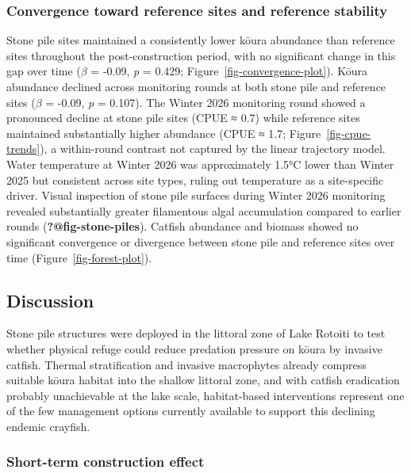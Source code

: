 \documentclass[
  letterpaper,
  DIV=11,
  numbers=noendperiod]{scrartcl}
\begin{document}
\subsubsection{Convergence toward reference sites and reference
stability}\label{convergence-toward-reference-sites-and-reference-stability}

Stone pile sites maintained a consistently lower kōura abundance than
reference sites throughout the post-construction period, with no
significant change in this gap over time (\(\beta\) = -0.09, \emph{p} =
0.429; {Figure~\ref{fig-convergence-plot}}). Kōura abundance declined
across monitoring rounds at both stone pile and reference sites
(\(\beta\) = -0.09, \emph{p} = 0.107). The Winter 2026 monitoring round
showed a pronounced decline at stone pile sites (CPUE ≈ 0.7) while
reference sites maintained substantially higher abundance (CPUE ≈ 1.7;
Figure~\ref{fig-cpue-trends}), a within-round contrast not captured by
the linear trajectory model. Water temperature at Winter 2026 was
approximately 1.5°C lower than Winter 2025 but consistent across site
types, ruling out temperature as a site-specific driver. Visual
inspection of stone pile surfaces during Winter 2026 monitoring revealed
substantially greater filamentous algal accumulation compared to earlier
rounds ({\textbf{?@fig-stone-piles}}). Catfish abundance and biomass
showed no significant convergence or divergence between stone pile and
reference sites over time (Figure~\ref{fig-forest-plot}).

\subsection{Discussion}\label{discussion}

Stone pile structures were deployed in the littoral zone of Lake Rotoiti
to test whether physical refuge could reduce predation pressure on kōura
by invasive catfish. Thermal stratification and invasive macrophytes
already compress suitable kōura habitat into the shallow littoral zone,
and with catfish eradication probably unachievable at the lake scale,
habitat-based interventions represent one of the few management options
currently available to support this declining endemic crayfish.

\subsubsection{Short-term construction
effect}\label{short-term-construction-effect}
\end{document}
